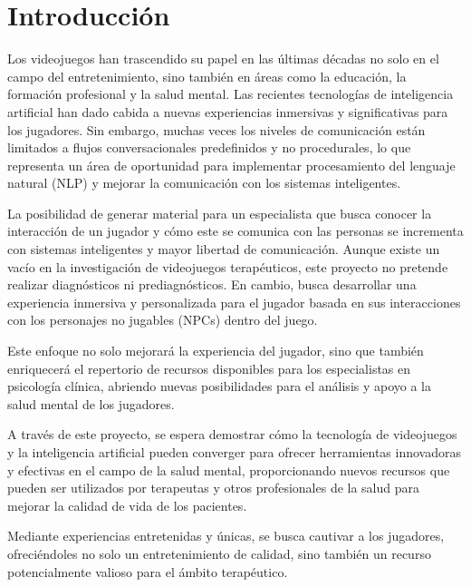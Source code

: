 \documentclass[12pt,twoside]{article}
\begin{document}
	\clearpage
	
	\tableofcontents
		
	\clearpage
		
	\section{Introducción}
	
	Los videojuegos han trascendido su papel en las últimas décadas no solo en el campo del entretenimiento, sino también en áreas como la educación, la formación profesional y la salud mental. Las recientes tecnologías de inteligencia artificial han dado cabida a nuevas experiencias inmersivas y significativas para los jugadores. Sin embargo, muchas veces los niveles de comunicación están limitados a flujos conversacionales predefinidos y no procedurales, lo que representa un área de oportunidad para implementar procesamiento del lenguaje natural (NLP) y mejorar la comunicación con los sistemas inteligentes.
	
	La posibilidad de generar material para un especialista que busca conocer la interacción de un jugador y cómo este se comunica con las personas se incrementa con sistemas inteligentes y mayor libertad de comunicación. Aunque existe un vacío en la investigación de videojuegos terapéuticos, este proyecto no pretende realizar diagnósticos ni prediagnósticos. En cambio, busca desarrollar una experiencia inmersiva y personalizada para el jugador basada en sus interacciones con los personajes no jugables (NPCs) dentro del juego.
	
	Este enfoque no solo mejorará la experiencia del jugador, sino que también enriquecerá el repertorio de recursos disponibles para los especialistas en psicología clínica, abriendo nuevas posibilidades para el análisis y apoyo a la salud mental de los jugadores.
	
	A través de este proyecto, se espera demostrar cómo la tecnología de videojuegos y la inteligencia artificial pueden converger para ofrecer herramientas innovadoras y efectivas en el campo de la salud mental, proporcionando nuevos recursos que pueden ser utilizados por terapeutas y otros profesionales de la salud para mejorar la calidad de vida de los pacientes.
	
	Mediante experiencias entretenidas y únicas, se busca cautivar a los jugadores, ofreciéndoles no solo un entretenimiento de calidad, sino también un recurso potencialmente valioso para el ámbito terapéutico.
	
	\clearpage
\end{document}

